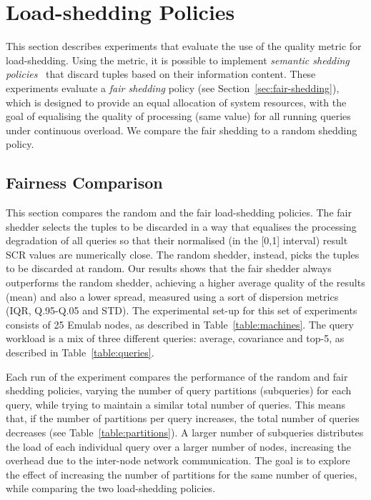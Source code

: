 \section{\mbox{Load-shedding} Policies}
\label{sec:ls-eval}

This section describes experiments that evaluate the use of the \sic quality metric for
\mbox{load-shedding}. Using the \sic metric, it is possible to implement \emph{semantic shedding
policies}~\cite{sem-ls} that discard tuples based on their information content.
These experiments evaluate a \emph{fair shedding} policy (see Section~\ref{sec:fair-shedding}), which is
designed to provide an equal allocation of system resources, with the goal of equalising the
quality of processing (\ie same \sic value) for all running queries under continuous overload.
We compare the fair shedding to a random shedding policy.
\vspace{-15pt}
\subsection*{Fairness Comparison}
\vspace{-5pt}
This section compares the random and the fair load-shedding policies. 
The fair shedder selects the tuples to be discarded in a way that equalises the processing
degradation of all queries so that their normalised (\ie in the [0,1] interval) result SCR values are numerically
close.
The random shedder, instead, picks the tuples to be discarded at random.
Our results shows that the fair shedder always outperforms the random shedder,
achieving a higher average quality of the results (mean) and also a lower spread, measured
using a sort of dispersion metrics (IQR, Q.95-Q.05 and STD).
The experimental set-up for this set of experiments consists of 25 Emulab nodes, as described in
Table~\ref{table:machines}.
The query workload is a mix of three different queries: average, covariance and top-5, as described in
Table~\ref{table:queries}. 

Each run of the experiment compares the performance of the random and fair shedding policies, varying the
number of query partitions (\ie subqueries) for each query, while trying to maintain a similar total
number of queries. 
This means that, if the number of partitions per query increases, the total number of queries
decreases (see Table~\ref{table:partitions}). 
A larger number of subqueries distributes the load of each individual query over
a larger number of nodes, increasing the overhead due to the inter-node network communication.
The goal is to explore the effect of increasing the number of partitions for the same number of queries,
while comparing the two load-shedding policies.

